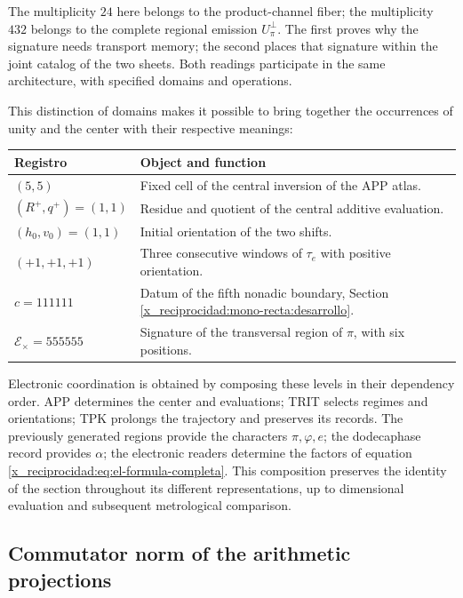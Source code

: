 The multiplicity \(24\) here belongs to the product-channel fiber;
the multiplicity \(432\) belongs to the complete regional emission
\(U_\pi^\perp\). The first proves why the signature needs transport
memory; the second places that signature within the joint catalog of
the two sheets. Both readings participate in the same architecture,
with specified domains and operations.

This distinction of domains makes it possible to bring together the occurrences of unity
and the center with their respective meanings:
\begin{center}
\small
\begin{tabularx}{\textwidth}{@{}lX@{}}
\toprule
Registro & Object and function \\
\midrule
\((5,5)\) & Fixed cell of the central inversion of the APP atlas.\\
\((R^+,q^+)=(1,1)\) & Residue and quotient of the central additive evaluation.\\
\((h_0,v_0)=(1,1)\) & Initial orientation of the two shifts.\\
\((+1,+1,+1)\) & Three consecutive windows of \(\tau_e\) with positive orientation.\\
\(c=111111\) & Datum of the fifth nonadic boundary, Section \ref{x_reciprocidad:mono-recta:desarrollo}.\\
\(\mathcal E_\times=555555\) & Signature of the transversal region of \(\pi\), with six positions.\\
\bottomrule
\end{tabularx}
\end{center}

Electronic coordination is obtained by composing these levels in their
dependency order. APP determines the center and evaluations;
TRIT selects regimes and orientations; TPK prolongs the trajectory
and preserves its records. The previously generated regions provide
the characters \(\pi,\varphi,e\); the dodecaphase record provides
\(\alpha\); the electronic readers determine the factors of
equation \eqref{x_reciprocidad:eq:el-formula-completa}. This composition preserves
the identity of the section throughout its different
representations, up to dimensional evaluation and subsequent
metrological comparison.



\subsection{Commutator norm of the arithmetic projections}

